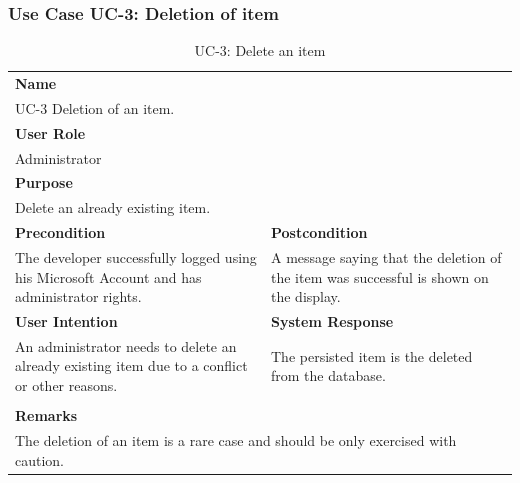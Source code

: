 \subsubsection{Use Case UC-3: Deletion of item}\label{subsubsec:use-case-uc-3:-deletion of-item}

\begin{table}[H]
    \centering
    \begin{tabular}{|p{}|p{}|}

        \hline
        \multicolumn{2}{|l|}{\rowcolor{gray!50}\textbf{Name}} \\
        \multicolumn{2}{|l|}{UC-3 Deletion of an item.} \\ \hline

        \multicolumn{2}{|l|}{\rowcolor{gray!50}\textbf{User Role}} \\
        \multicolumn{2}{|l|}{Administrator} \\ \hline

        \multicolumn{2}{|l|}{\rowcolor{gray!50}\textbf{Purpose}} \\
        \multicolumn{2}{|l|}{Delete an already existing item.} \\ \hline

        \rowcolor{gray!50}\textbf{Precondition} & \rowcolor{gray!50}\textbf{Postcondition} \\
        The developer successfully logged using his Microsoft Account and has administrator rights.
        &
        A message saying that the deletion of the item was successful is shown on the display. \\ \hline

        \rowcolor{gray!50}\textbf{User Intention} & \rowcolor{gray!50}\textbf{System Response} \\
        An administrator needs to delete an already existing item due to a conflict or other reasons.
        &
        The persisted item is the deleted from the database. \\ \hline

        & \\ \hline

        \multicolumn{2}{|l|}{\rowcolor{gray!50}\textbf{Remarks}} \\
        \multicolumn{2}{|p{1\textwidth}|}{The deletion of an item is a rare case and should be only exercised with caution.} \\ \hline
    \end{tabular}
    \caption{UC-3: Delete an item}
    \label{tab:uc-delete-an-item}
\end{table}

